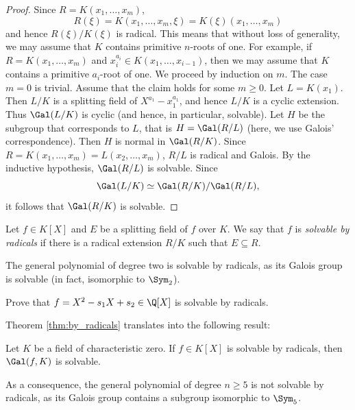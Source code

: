 \begin{proof}
    Since
    $R=K(x_1,\dots,x_m)$,  
    \[
    R(\xi)=K(x_1,\dots,x_m,\xi)=K(\xi)(x_1,\dots,x_m)
    \]
    and hence $R(\xi)/K(\xi)$ is radical. 
    This means that
    without loss of generality, we may assume that
    $K$ contains primitive $n$-roots of one. For example, 
    if $R=K(x_1,\dots,x_m)$ and $x_i^{a_i}\in K(x_1,\dots,x_{i-1})$, 
    then we may assume that $K$ contains a primitive $a_i$-root of one. We proceed by induction on $m$. 
    The case $m=0$ is trivial. Assume that the claim holds for some $m\geq0$. Let 
    $L=K(x_1)$. Then $L/K$ is a splitting field of $X^{a_1}-x_1^{a_1}$, and hence
    $L/K$ is a cyclic extension. Thus $\Gal(L/K)$ is cyclic (and hence, in particular, solvable). 
    Let $H$ be the subgroup that corresponds to $L$, that is
    $H=\Gal(R/L)$ (here, we use Galois' correspondence). Then $H$ is normal in $\Gal(R/K)$. 
    Since $R=K(x_1,\dots,x_m)=L(x_2,\dots,x_m)$, $R/L$ is radical and Galois. By the inductive hypothesis, 
    $\Gal(R/L)$ is solvable. Since 
    \[
    \Gal(L/K)\simeq \Gal(R/K)/\Gal(R/L),
    \]
    it follows that $\Gal(R/K)$ is solvable. 
\end{proof}

\begin{definition}
    Let $f\in K[X]$ and $E$ be a splitting field of $f$ over $K$. 
    We say that $f$ is \emph{solvable by radicals} if
    there is a radical extension $R/K$ such that $E\subseteq R$. 
\end{definition}

The general polynomial of degree two 
is solvable by radicals, as its Galois group 
is solvable (in fact, isomorphic to $\Sym_2$).  

\begin{exercise}
    Prove that $f=X^2-s_1X+s_2\in\Q[X]$ is solvable by radicals. 
\end{exercise}

Theorem \ref{thm:by_radicals} translates into the following result:

\begin{exercise}
    Let $K$ be a field of characteristic zero. 
    If $f\in K[X]$ is solvable by radicals, then $\Gal(f,K)$ is solvable. 
\end{exercise}

As a consequence, the general polynomial of degree $n\geq5$ 
is not solvable by radicals, as its Galois group contains a subgroup isomorphic to $\Sym_5$. 

